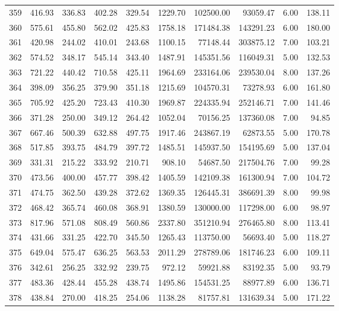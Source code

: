 \begin{tabular}{lrrrrrrrrr}
359 & 416.93 & 336.83 & 402.28 & 329.54 & 1229.70 & 102500.00 & 93059.47 & 6.00 & 138.11 \\
360 & 575.61 & 455.80 & 562.02 & 425.83 & 1758.18 & 171484.38 & 143291.23 & 6.00 & 180.00 \\
361 & 420.98 & 244.02 & 410.01 & 243.68 & 1100.15 & 77148.44 & 303875.12 & 7.00 & 103.21 \\
362 & 574.52 & 348.17 & 545.14 & 343.40 & 1487.91 & 145351.56 & 116049.31 & 5.00 & 132.53 \\
363 & 721.22 & 440.42 & 710.58 & 425.11 & 1964.69 & 233164.06 & 239530.04 & 8.00 & 137.26 \\
364 & 398.09 & 356.25 & 379.90 & 351.18 & 1215.69 & 104570.31 & 73278.93 & 6.00 & 161.80 \\
365 & 705.92 & 425.20 & 723.43 & 410.30 & 1969.87 & 224335.94 & 252146.71 & 7.00 & 141.46 \\
366 & 371.28 & 250.00 & 349.12 & 264.42 & 1052.04 & 70156.25 & 137360.08 & 7.00 & 94.85 \\
367 & 667.46 & 500.39 & 632.88 & 497.75 & 1917.46 & 243867.19 & 62873.55 & 5.00 & 170.78 \\
368 & 517.85 & 393.75 & 484.79 & 397.72 & 1485.51 & 145937.50 & 154195.69 & 5.00 & 137.04 \\
369 & 331.31 & 215.22 & 333.92 & 210.71 & 908.10 & 54687.50 & 217504.76 & 7.00 & 99.28 \\
370 & 473.56 & 400.00 & 457.77 & 398.42 & 1405.59 & 142109.38 & 161300.94 & 7.00 & 104.72 \\
371 & 474.75 & 362.50 & 439.28 & 372.62 & 1369.35 & 126445.31 & 386691.39 & 8.00 & 99.98 \\
372 & 468.42 & 365.74 & 460.08 & 368.91 & 1380.59 & 130000.00 & 117298.00 & 6.00 & 98.97 \\
373 & 817.96 & 571.08 & 808.49 & 560.86 & 2337.80 & 351210.94 & 276465.80 & 8.00 & 113.41 \\
374 & 431.66 & 331.25 & 422.70 & 345.50 & 1265.43 & 113750.00 & 56693.40 & 5.00 & 118.27 \\
375 & 649.04 & 575.47 & 636.25 & 563.53 & 2011.29 & 278789.06 & 181746.23 & 6.00 & 109.11 \\
376 & 342.61 & 256.25 & 332.92 & 239.75 & 972.12 & 59921.88 & 83192.35 & 5.00 & 93.79 \\
377 & 483.36 & 428.44 & 455.28 & 438.74 & 1495.86 & 154531.25 & 88977.89 & 6.00 & 136.71 \\
378 & 438.84 & 270.00 & 418.25 & 254.06 & 1138.28 & 81757.81 & 131639.34 & 5.00 & 171.22 \\

\end{tabular}
